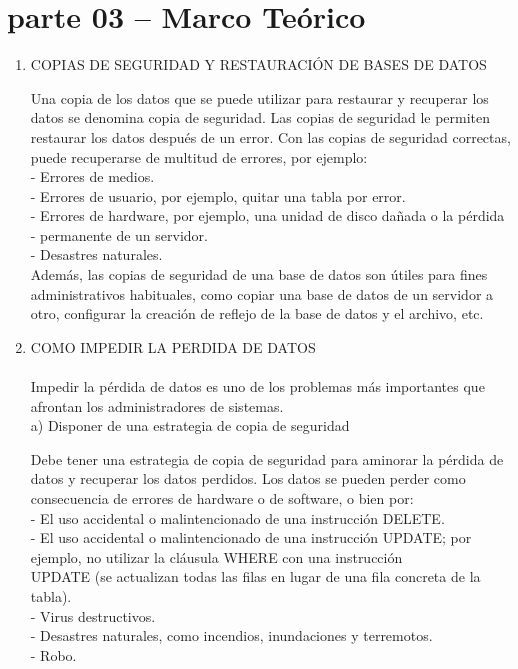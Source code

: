 \section{parte 03 –  Marco Teórico} 

\begin{enumerate}[3.1.]
	\item COPIAS DE SEGURIDAD Y RESTAURACIÓN DE BASES DE DATOS
	

Una copia de los datos que se puede utilizar para restaurar y recuperar los datos se denomina copia de seguridad. Las copias de seguridad le permiten restaurar los datos después de un error. Con las copias de seguridad correctas, puede recuperarse de multitud de errores, por ejemplo:\\

- Errores de medios.\\
- Errores de usuario, por ejemplo, quitar una tabla por error.\\
- Errores de hardware, por ejemplo, una unidad de disco dañada o la pérdida\\
- permanente de un servidor.\\
- Desastres naturales.\\

Además, las copias de seguridad de una base de datos son útiles para fines administrativos habituales, como copiar una base de datos de un servidor a otro, configurar la creación de reflejo de la base de datos y el archivo, etc.\\
	

\item COMO IMPEDIR LA PERDIDA DE DATOS\\
\\	
Impedir la pérdida de datos es uno de los problemas más importantes que afrontan los administradores de sistemas.\\

a) Disponer de una estrategia de copia de seguridad

Debe tener una estrategia de copia de seguridad para aminorar la pérdida de datos y recuperar los datos perdidos. Los datos se pueden perder como consecuencia de errores de hardware o de software, o bien por:\\

- El uso accidental o malintencionado de una instrucción DELETE.\\
- El uso accidental o malintencionado de una instrucción UPDATE; por ejemplo, no utilizar la cláusula WHERE con una instrucción\\ UPDATE (se actualizan todas las filas en lugar de una fila concreta de la tabla).\\
- Virus destructivos.\\
- Desastres naturales, como incendios, inundaciones y terremotos.\\
- Robo.\\


\end{enumerate}
